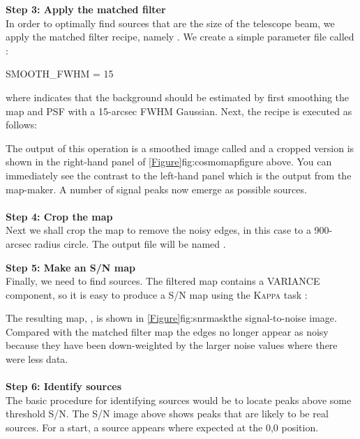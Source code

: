 \textbf{Step 3: Apply the matched filter}\\
In order to optimally find sources that are the size of the telescope
beam, we apply the matched filter recipe, namely
.
We create a simple parameter file called :

\begin{terminalv}
SMOOTH_FWHM = 15
\end{terminalv}
where  indicates that the background should be
estimated by first smoothing the map and PSF with a 15-arcsec FWHM
Gaussian. Next, the recipe is executed as follows:
%
\begin{terminalv}
\end{terminalv}
%
The output of this operation is a smoothed image called
 and a cropped version is shown in the
right-hand panel of \cref{Figure}{fig:cosmomap}{figure above}. You can immediately
see the contrast to the left-hand panel which is the output from the
map-maker. A number of signal peaks now emerge as possible sources.
\\ \\
\textbf{Step 4: Crop the map}\\
Next we shall crop the map to remove the noisy edges,
in this case to a 900-arcsec radius circle. The output file will be named
.
\begin{terminalv}

\end{terminalv}


\textbf{Step 5: Make an S/N map}\\
Finally, we need to find sources. The filtered map contains a
VARIANCE component, so it is easy to produce a S/N map using the
\textsc{Kappa} task \makesnr:
\begin{terminalv}
\end{terminalv}

The resulting map, , is shown in
\cref{Figure}{fig:snrmask}{the signal-to-noise image}. Compared with the
matched filter map the
edges no longer appear as noisy because they have been down-weighted
by the larger noise values where there were less data.
\\ \\
\textbf{Step 6: Identify sources}\\
The basic procedure for identifying sources would be to locate peaks
above some threshold S/N. The S/N image above shows peaks that are
likely to be real sources. For a start, a source appears where
expected at the 0,0 position.

